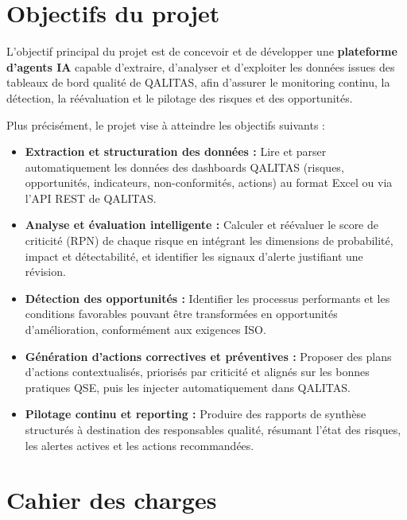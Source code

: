 \section{Objectifs du projet}

L'objectif principal du projet est de concevoir et de développer une \textbf{plateforme d'agents IA} capable d'extraire, d'analyser et d'exploiter les données issues des tableaux de bord qualité de QALITAS, afin d'assurer le monitoring continu, la détection, la réévaluation et le pilotage des risques et des opportunités.

Plus précisément, le projet vise à atteindre les objectifs suivants :

\begin{itemize}
    \item \textbf{Extraction et structuration des données :} Lire et parser automatiquement les données des dashboards QALITAS (risques, opportunités, indicateurs, non-conformités, actions) au format Excel ou via l'API REST de QALITAS.

    \item \textbf{Analyse et évaluation intelligente :} Calculer et réévaluer le score de criticité (RPN) de chaque risque en intégrant les dimensions de probabilité, impact et détectabilité, et identifier les signaux d'alerte justifiant une révision.

    \item \textbf{Détection des opportunités :} Identifier les processus performants et les conditions favorables pouvant être transformées en opportunités d'amélioration, conformément aux exigences ISO.

    \item \textbf{Génération d'actions correctives et préventives :} Proposer des plans d'actions contextualisés, priorisés par criticité et alignés sur les bonnes pratiques QSE, puis les injecter automatiquement dans QALITAS.

    \item \textbf{Pilotage continu et reporting :} Produire des rapports de synthèse structurés à destination des responsables qualité, résumant l'état des risques, les alertes actives et les actions recommandées.
\end{itemize}

\section{Cahier des charges}

